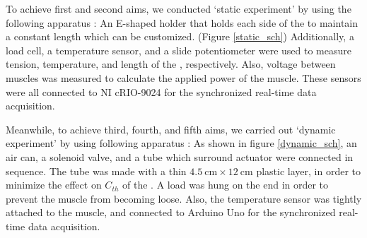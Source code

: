 To achieve first and second aims, we conducted `static experiment' by using the following apparatus : An E-shaped holder that holds each side of the \scp to maintain a constant length which can be customized. (Figure \ref{static_sch}) Additionally, a load cell, a temperature sensor, and a slide potentiometer were used to measure tension, temperature, and length of the \scpnospace, respectively. Also, voltage between muscles was measured to calculate the applied power of the muscle. These sensors were all connected to NI cRIO-9024 for the synchronized real-time data acquisition.

Meanwhile, to achieve third, fourth, and fifth aims, we carried out `dynamic experiment' by using following apparatus : As shown in figure \ref{dynamic_sch}, an air can, a solenoid valve, and a tube which surround actuator were connected in sequence. 
The tube was made with a thin $\SI{4.5}{\centi\meter} \times \SI{12}{\centi\meter}$ plastic layer, in order to minimize the effect on $C_{th}$ of the \scpnospace.
A load was hung on the end in order to prevent the muscle from becoming loose. 
Also, the temperature sensor was tightly attached to the muscle, and connected to Arduino Uno for the synchronized real-time data acquisition.



